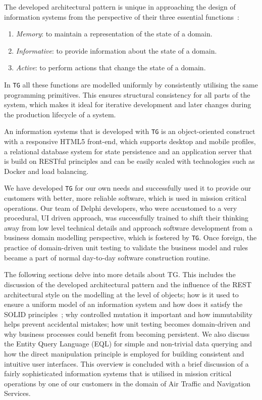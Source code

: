 \documentclass[a4paper,12pt,oneside,openright,final]{memoir} %
\begin{document}
	The developed architectural pattern is unique in approaching the design of information systems from the perspective of their three essential functions~\cite{oli2007}:
	\begin{enumerate}
    	\item \emph{Memory}: to maintain a representation of the state of a domain.
    	\item \emph{Informative}: to provide information about the state of a domain.
    	\item \emph{Active}: to perform actions that change the state of a domain. 
	\end{enumerate}  	
	In \texttt{TG} all these functions are modelled uniformly by consistently utilising the same programming primitives.
	This ensures structural consistency for all parts of the system, which makes it ideal for iterative development and later changes during the production lifecycle of a system.
		
	An information systems that is developed with \texttt{TG} is an object-oriented construct with a responsive HTML5 front-end, which supports desktop and mobile profiles, a relational database system for state persistence and an application server that is build on RESTful principles and can be easily scaled with technologies such as Docker and load balancing.
	
	We have developed \texttt{TG} for our own needs and successfully used it to provide our customers with better, more reliable software, which is used in mission critical operations.
	Our team of Delphi developers, who were accustomed to a very procedural, UI driven approach, was successfully trained to shift their thinking away from low level technical details and approach software development from a business domain modelling perspective, which is fostered by \texttt{TG}.
	Once foreign, the practice of domain-driven unit testing to validate the business model and rules became a part of normal day-to-day software construction routine.
	
	
	The following sections delve into more details about TG.
	This includes the discussion of the developed architectural pattern and the influence of the REST architectural style on the modelling at the level of objects; how is it used to ensure a uniform model of an information system and how does it satisfy the SOLID principles~\cite{SOLID}; why controlled mutation it important and how immutability helps prevent accidental mistakes; how unit testing becomes domain-driven and why business processes could benefit from becoming persistent.
	We also discuss the Entity Query Language (EQL) for simple and non-trivial data querying and how the direct manipulation principle is employed for building consistent and intuitive user interfaces.
	This overview is concluded with a brief discussion of a fairly sophisticated information systems that is utilised in mission critical operations by one of our customers in the domain of Air Traffic and Navigation Services.
\end{document}
